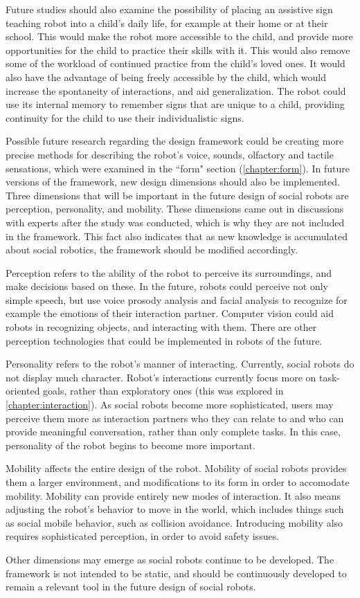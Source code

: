 Future studies should also examine the possibility of placing an assistive sign teaching robot into a child's daily life, for example at their home or at their school. This would make the robot more accessible to the child, and provide more opportunities for the child to practice their skills with it. This would also remove some of the workload of continued practice from the child's loved ones. It would also have the advantage of being freely accessible by the child,  which would increase the spontaneity of interactions, and aid generalization. The robot could use its internal memory to remember signs that are unique to a child, providing continuity for the child to use their individualistic signs. 

Possible future research regarding the design framework could be creating more precise methods for describing the robot's voice, sounds, olfactory and tactile sensations, which were examined in the ``form" section (\ref{chapter:form}). In future versions of the framework, new design dimensions should also be implemented. Three dimensions that will be important in the future design of social robots are perception, personality, and mobility. These dimensions came out in discussions with experts after the study was conducted, which is why they are not included in the framework. This fact also indicates that as new knowledge is accumulated about social robotics, the framework should be modified accordingly.

Perception refers to the ability of the robot to perceive its surroundings, and make decisions based on these. In the future, robots could perceive not only simple speech, but use voice prosody analysis and facial analysis to recognize for example the emotions of their interaction partner. Computer vision could aid robots in recognizing objects, and interacting with them. There are other perception technologies that could be implemented in robots of the future.

Personality refers to the robot's manner of interacting. Currently, social robots do not display much character. Robot's interactions currently focus more on task-oriented goals, rather than exploratory ones (this was explored in \ref{chapter:interaction}). As social robots become more sophisticated, users may perceive them more as interaction partners who they can relate to and who can provide meaningful conversation, rather than only complete tasks. In this case, personality of the robot begins to become more important.

Mobility affects the entire design of the robot. Mobility of social robots provides them a larger environment, and modifications to its form in order to accomodate mobility. Mobility can provide entirely new modes of interaction. It also means adjusting the robot's behavior to move in the world, which includes things such as social mobile behavior, such as collision avoidance. Introducing mobility also requires sophisticated perception, in order to avoid safety issues.

Other dimensions may emerge as social robots continue to be developed. The framework is not intended to be static, and should be continuously developed to remain a relevant tool in the future design of social robots.
